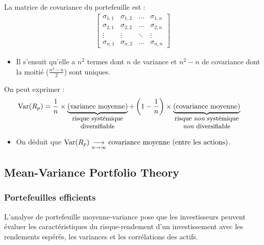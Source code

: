\documentclass[10pt, french]{article}
\begin{document}
\begin{multicols*}{2}
La matrice de covariance du portefeuille est : 
\begin{align*}
	\begin{bmatrix}
	\sigma_{1, 1}	&	\sigma_{1, 2}	&	\hdots	&	\sigma_{1, n}	\\
	\sigma_{2, 1}	&	\sigma_{2, 2}	&	\hdots	&	\sigma_{2, n}	\\
	\vdots	&	\vdots	&	\ddots	&	\vdots	\\
	\sigma_{n, 1}	&	\sigma_{n, 2}	&	\hdots	&	\sigma_{n, n}	
	\end{bmatrix}
\end{align*}
\begin{itemize}
	\item	Il s'ensuit qu'elle a $n^{2}$ termes dont $n$ de variance et $n^{2}	-	n$ de covariance dont la moitié ($\frac{n^{2} - n}{2}$) sont uniques.
\end{itemize}

On peut exprimer :
	\setlength{\mathindent}{-1cm}
	\begin{align*}
	\text{Var}(R_{p})	
	&=	\frac{1}{n} \times \underbrace{\left(\text{variance moyenne}\right)}_{\small{\shortstack{risque systémique\\ diversifiable}}} + \left(1 - \frac{1}{n}\right)  \times  \underbrace{\left(\text{covariance moyenne}\right)}_{\small{\shortstack{risque \textit{non} systémique\\ \textit{non} diversifiable}}}
	\end{align*}
	\setlength{\mathindent}{1cm}

\begin{itemize}
	\item	On déduit que $\text{Var}(R_{p}) \underset{n\rightarrow \infty}{\longrightarrow} \shortstack{covariance moyenne (entre les actions)}$.
\end{itemize}


\columnbreak
\subsection{Mean-Variance Portfolio Theory}
\subsubsection{Portefeuilles efficients}
\begin{definitionNOHFILL}
L'analyse de portefeuille moyenne-variance pose que les investisseurs peuvent évaluer les caractéristiques du risque-rendement d'un investissement avec les rendements espérés, les variances et les corrélations des actifs.
\end{definitionNOHFILL}


\end{multicols*}
\end{document}
